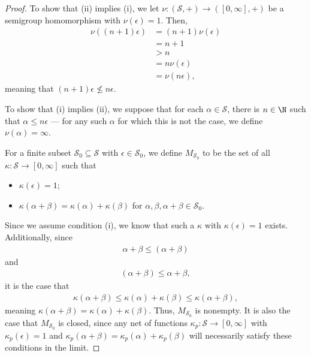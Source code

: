 \begin{proof}
  To show that (ii) implies (i), we let $\nu\colon \left(\mathcal{S},+\right)\rightarrow \left([0,\infty],+\right)$ be a semigroup homomorphism with $\nu\left(\epsilon\right) = 1$. Then,
  \begin{align*}
    \nu\left(\left(n+1\right)\epsilon\right) &= \left(n+1\right)\nu\left(\epsilon\right)\\
                                             &= n+1\\
                                             &> n\\
                                             &= n\nu\left(\epsilon\right)\\
                                             &= \nu\left(n\epsilon\right),
  \end{align*}
  meaning that $\left(n+1\right)\epsilon \nleq n\epsilon$.\newline

  To show that (i) implies (ii), we suppose that for each $\alpha \in \mathcal{S}$, there is $n\in \N$ such that $\alpha \leq n\epsilon$ --- for any such $\alpha$ for which this is not the case, we define $\nu\left(\alpha\right) = \infty$.\newline

  For a finite subset $\mathcal{S}_0 \subseteq \mathcal{S}$ with $\epsilon\in \mathcal{S}_0$, we define $M_{\mathcal{S}_0}$ to be the set of all $\kappa\colon \mathcal{S}\rightarrow [0,\infty]$ such that
  \begin{itemize}
    \item $\kappa\left(\epsilon\right) = 1$;
    \item $\kappa\left(\alpha + \beta\right) = \kappa\left(\alpha\right) + \kappa\left(\beta\right)$ for $\alpha,\beta,\alpha + \beta\in \mathcal{S}_0$.
  \end{itemize}
  Since we assume condition (i), we know that such a $\kappa$ with $\kappa\left(\epsilon\right) = 1$ exists. Additionally, since
  \begin{align*}
    \alpha + \beta \leq \left(\alpha + \beta\right)
  \end{align*}
  and
  \begin{align*}
    \left(\alpha + \beta\right) \leq \alpha + \beta,
  \end{align*}
  it is the case that
  \begin{align*}
    \kappa\left(\alpha + \beta\right) \leq \kappa\left(\alpha\right) + \kappa\left(\beta\right) \leq \kappa\left(\alpha + \beta\right),
  \end{align*}
  meaning $\kappa\left(\alpha + \beta\right) = \kappa\left(\alpha\right) + \kappa\left(\beta\right)$. Thus, $M_{\mathcal{S}_0}$ is nonempty. It is also the case that $M_{\mathcal{S}_0}$ is closed, since any net of functions $\kappa_{p}\colon \mathcal{S}\rightarrow [0,\infty]$ with $\kappa_{p}\left(\epsilon\right) = 1$ and $\kappa_{p}\left(\alpha + \beta\right) = \kappa_{p}\left(\alpha\right) + \kappa_{p}\left(\beta\right)$ will necessarily satisfy these conditions in the limit.\newline


\end{proof}
